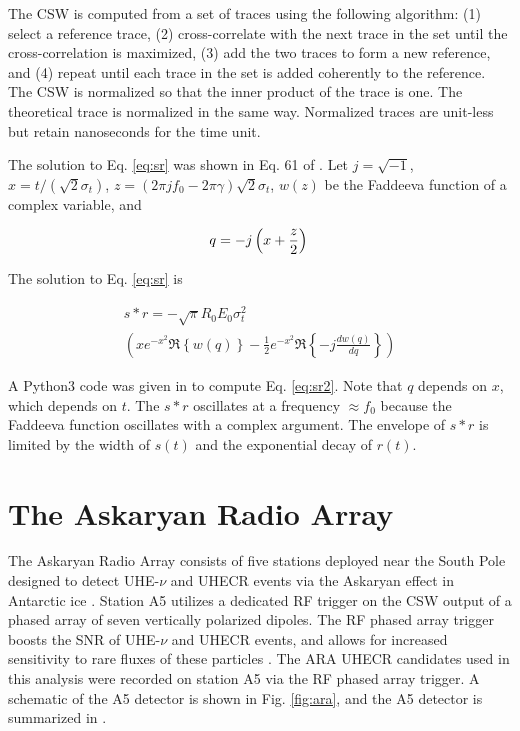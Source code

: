 \documentclass[amsmath,amssymb,aps,prd,10pt,twocolumn,showkeys]{revtex4}
\begin{document}
The CSW is computed from a set of traces using the following algorithm: (1) select a reference trace, (2) cross-correlate with the next trace in the set until the cross-correlation is maximized, (3) add the two traces to form a new reference, and (4) repeat until each trace in the set is added coherently to the reference.  The CSW is normalized so that the inner product of the trace is one.  The theoretical trace is normalized in the same way.  Normalized traces are unit-less but retain nanoseconds for the time unit.

The solution to Eq. \ref{eq:sr} was shown in Eq. 61 of \cite{hansonnoyearcomplex-ae0}.  Let $j = \sqrt{-1}$, $x = t/(\sqrt{2}\sigma_t)$, $z = (2\pi j f_0 - 2\pi\gamma)\sqrt{2}\sigma_t$, $w(z)$ be the Faddeeva function of a complex variable, and

\begin{equation}
q = -j\left(x + \frac{z}{2}\right) \\
\end{equation}

The solution to Eq. \ref{eq:sr} is

\begin{multline}
s * r = -\sqrt{\pi}R_0 E_0 \sigma_t^2 \\ \left(xe^{-x^2} \Re\left\lbrace w(q) \right\rbrace - \frac{1}{2}e^{-x^2} \Re\left\lbrace -j \frac{d w(q)}{dq} \right\rbrace \right) \label{eq:sr2}
\end{multline}

A Python3 code was given in \cite{hansonnoyearcomplex-ae0} to compute Eq. \ref{eq:sr2}.  Note that $q$ depends on $x$, which depends on $t$.  The $s * r$ oscillates at a frequency $\approx f_0$ because the Faddeeva function oscillates with a complex argument.  The envelope of $s * r$ is limited by the width of $s(t)$ and the exponential decay of $r(t)$.

\newpage 

\section{The Askaryan Radio Array}
\label{sec:ara}

The Askaryan Radio Array consists of five stations deployed near the South Pole designed to detect UHE-$\nu$ and UHECR events via the Askaryan effect in Antarctic ice \cite{allison2022lowthreshold-795,10.1103/physrevd.102.043021,allison2012design-cd3,testbed}.  Station A5 utilizes a dedicated RF trigger on the CSW output of a phased array of seven vertically polarized dipoles.  The RF phased array trigger boosts the SNR of UHE-$\nu$ and UHECR events, and allows for increased sensitivity to rare fluxes of these particles \cite{avva2017development-713}.  The ARA UHECR candidates used in this analysis were recorded on station A5 via the RF phased array trigger.  A schematic of the A5 detector is shown in Fig. \ref{fig:ara}, and the A5 detector is summarized in \cite{allison2022lowthreshold-795}.
\end{document}
